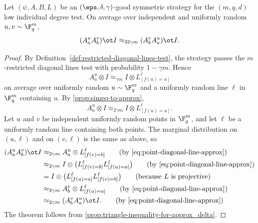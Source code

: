 \begin{theorem}\label{thm:commutativity-points}
	\leanok
	Let $(\psi,A,B,L)$ be an $(\eps,\delta,\gamma)$-good symmetric strategy for the $(m,q,d)$ low individual degree test.
	On average over independent and uniformly random $u,v \sim \F_q^m$,
	\[
		(A_a^u A_b^v) \ot I \approx_{32\gamma m} (A_b^v A_a^u) \ot I.
	\]
\end{theorem}
\begin{proof}
	\leanok
	By Definition~\ref{def:restricted-diagonal-lines-test}, the strategy passes the $m$-restricted diagonal lines test with probability $1-\gamma m$. Hence
	\[
		A_a^u \otimes I \simeq_{\gamma m} I \otimes L^\ell_{[f(u)=a]}
	\]
	on average over uniformly random $u \sim \F_q^m$ and a uniformly random line $\ell$ in $\F_q^m$ containing $u$. By \ref{prop:simeq-to-approx},
	\begin{equation}\label{eq:point-diagonal-line-approx}
		A_a^u \otimes I \approx_{2\gamma m} I \otimes L^\ell_{[f(u)=a]}.
	\end{equation}
	Let $u$ and $v$ be independent uniformly random points in $\F_q^m$, and let $\ell$ be a uniformly random line containing both points. The marginal distribution on $(u,\ell)$ and on $(v,\ell)$ is the same as above, so
	\begin{align*}
		(A_a^u A_b^v) \ot I
		 & \approx_{2\gamma m} A_a^u \otimes L^\ell_{[f(v)=b]} \tag{by \ref{eq:point-diagonal-line-approx}}                           \\
		 & \approx_{2\gamma m} I \otimes \bigl(L^\ell_{[f(v)=b]} L^\ell_{[f(u)=a]}\bigr) \tag{by \ref{eq:point-diagonal-line-approx}} \\
		 & = I \otimes \bigl(L^\ell_{[f(u)=a]} L^\ell_{[f(v)=b]}\bigr) \tag{because~$L$ is projective}                                \\
		 & \approx_{2\gamma m} A_b^v \otimes L^\ell_{[f(u)=a]} \tag{by \ref{eq:point-diagonal-line-approx}}                           \\
		 & \approx_{2\gamma m} (A_b^v A_a^u) \ot I. \tag{by \ref{eq:point-diagonal-line-approx}}
	\end{align*}
	The theorem follows from \ref{prop:triangle-inequality-for-approx_delta}.
\end{proof}


